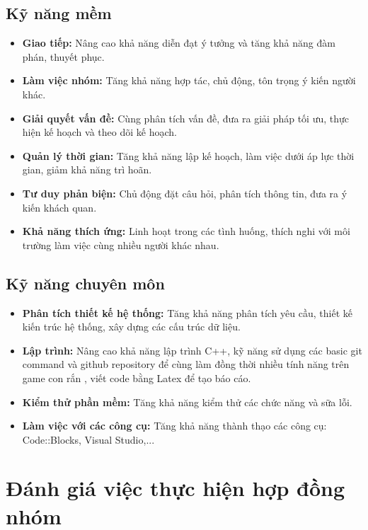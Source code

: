 \documentclass[12pt]{report}
\begin{document}
\section{Kỹ năng mềm}
\begin{itemize}
    \item \textbf{Giao tiếp:} Nâng cao khả năng diễn đạt ý tưởng và tăng khả năng đàm phán, thuyết phục.
    \item \textbf{Làm việc nhóm:} Tăng khả năng hợp tác, chủ động, tôn trọng ý kiến người khác.
    \item \textbf{Giải quyết vấn đề:} Cùng phân tích vấn đề, đưa ra giải pháp tối ưu, thực hiện kế hoạch và theo dõi kế hoạch.
    \item \textbf{Quản lý thời gian:} Tăng khả năng lập kế hoạch, làm việc dưới áp lực thời gian, giảm khả năng trì hoãn.
    \item \textbf{Tư duy phản biện:} Chủ động đặt câu hỏi, phân tích thông tin, đưa ra ý kiến khách quan.
    \item \textbf{Khả năng thích ứng:} Linh hoạt trong các tình huống, thích nghi với môi trường làm việc cùng nhiều người khác nhau.
\end{itemize}
\section{Kỹ năng chuyên môn}
\begin{itemize}
    \item \textbf{Phân tích thiết kế hệ thống:} Tăng khả năng phân tích yêu cầu, thiết kế kiến trúc hệ thống, xây dựng các cấu trúc dữ liệu.
    \item \textbf{Lập trình:} Nâng cao khả năng lập trình C++, kỹ năng sử dụng các basic git command và github repository để cùng làm đồng thời nhiều tính năng trên game con rắn , viết code bằng Latex để tạo báo cáo.
    \item \textbf{Kiểm thử phần mềm:} Tăng khả năng kiểm thử các chức năng và sữa lỗi.
    \item \textbf{Làm việc với các công cụ:} Tăng khả năng thành thạo các công cụ: Code::Blocks, Visual Studio,...
\end{itemize}

\chapter{Đánh giá việc thực hiện hợp đồng nhóm}
\label{sec:member_ratings}
\end{document}
